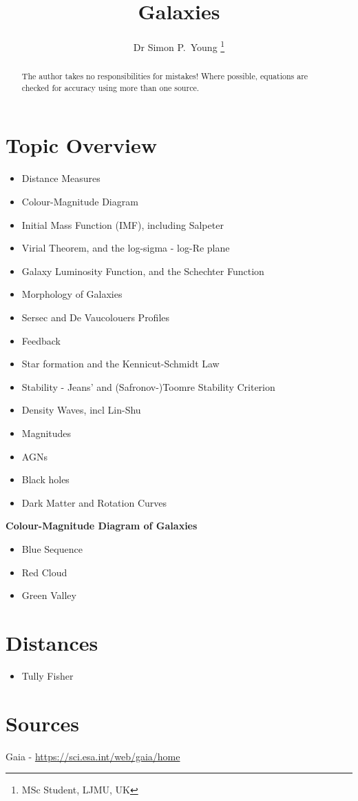 \documentclass{article}
\author{Dr Simon P.~Young \thanks{MSc Student, LJMU, UK}}
\title {Galaxies}
\begin{document}
\maketitle


\begin{abstract}
The author takes no responsibilities for mistakes! Where possible, equations are checked for accuracy using more than one source.
\end{abstract}

\tableofcontents

\newpage

\section {Topic Overview}

\begin{itemize}
  \item Distance Measures
  \item Colour-Magnitude Diagram
  \item Initial Mass Function (IMF), including Salpeter
  \item Virial Theorem, and the log-sigma - log-Re plane
  \item Galaxy Luminosity Function, and the Schechter Function
  \item Morphology of Galaxies
  \item Sersec and De Vaucolouers Profiles
  \item Feedback
  \item Star formation and the Kennicut-Schmidt Law
  \item Stability - Jeans' and (Safronov-)Toomre Stability Criterion
  \item Density Waves, incl Lin-Shu
  \item Magnitudes
  \item AGNs
  \item Black holes
  \item Dark Matter and Rotation Curves

\end{itemize}

\newpage
\textbf{Colour-Magnitude Diagram of Galaxies}
\begin{itemize}
  \item Blue Sequence
  \item Red Cloud
  \item Green Valley
\end{itemize}


\section {Distances}

\begin{itemize}
    \item Tully Fisher
\end{itemize}


\newpage

\section {Sources}
Gaia - \url{https://sci.esa.int/web/gaia/home}
\end{document}
